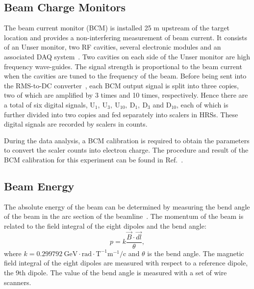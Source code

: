 \subsection{Beam Charge Monitors}
The beam current monitor (BCM) is installed 25 m upstream of the target location and provides a non-interfering measurement of beam current. It consists of an Unser monitor, two RF cavities, several electronic modules and an associated DAQ system~\cite{halla_nim}. Two cavities on each side of the Unser monitor are high frequency wave-guides. The signal strength is proportional to the beam current when the cavities are tuned to the frequency of the beam. Before being sent into the RMS-to-DC converter~\cite{halla_nim}, each BCM output signal is split into three copies, two of which are amplified by 3 times and 10 times, respectively. Hence there are a total of six digital signals, $\mathrm{U_{1},~U_{3},~U_{10},~D_{1},~D_{3}}$ and $\mathrm{D_{10}}$, each of which is further divided into two copies and fed separately into scalers in HRSs. These digital signals are recorded by scalers in counts.

 During the data analysis, a BCM calibration is required to obtain the parameters to convert the scaler counts into electron charge. The procedure and result of the BCM calibration for this experiment can be found in Ref.~\cite{bcm_patricia}.
 
\subsection{Beam Energy}
The absolute energy of the beam can be determined by measuring the bend angle of the beam in the arc section of the beamline~\cite{beam_energy1,beam_energy2}. The momentum of the beam is related to the field integral of the eight dipoles and the bend angle:
\begin{equation}
  p = k \frac{\vec{B}\cdot \vec{dl}}{\theta},
\end{equation}
where $k\mathrm{=0.299792~GeV\cdot rad\cdot T^{-1}m^{-1}/c}$ and $\theta$ is the bend angle. The magnetic field integral of the eight dipoles are measured with respect to a reference dipole, the 9th dipole. The value of the bend angle is measured with a set of wire scanners.
 
